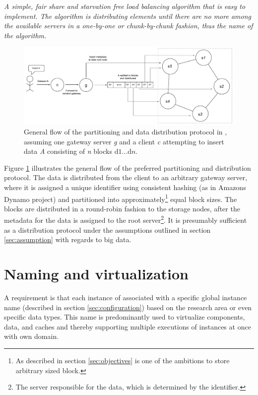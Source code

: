 \begin{definition} \label{def:rr}
\textit{A simple, fair share and starvation free load balancing algorithm that is easy to implement. The algorithm is distributing elements until there are no more among the available servers in a one-by-one or chunk-by-chunk fashion, thus the name of the algorithm.}
\end{definition}
\vspace*{3mm}

\begin{figure}[h!]
	\centering
	\includegraphics[scale=0.5]{pdf/rr-partitioning.pdf}
	\caption[Overview of the partitioning and data distribution protocol]{General flow of the partitioning and data distribution protocol in \CodeName, assuming one gateway server \textit{g} and a client \textit{c} attempting to insert data \textit{A} consisting of \textit{n} blocks $\text{d}1 \ldots \text{d}n$.\label{fig:rr-partitioning}}
\end{figure}

\vspace*{3mm}
Figure \ref{fig:rr-partitioning} illustrates the general flow of the preferred partitioning and distribution protocol. The data is distributed from the client to an arbitrary gateway server, where it is assigned a unique identifier using consistent hashing (as in Amazons Dynamo project) and partitioned into approximately\footnote{As described in section \ref{sec:objectives} is one of the ambitions to store arbitrary sized block.} equal block sizes. The blocks are distributed in a round-robin fashion to the storage nodes, after the metadata for the data is assigned to the root server\footnote{The server responsible for the data, which is determined by the identifier.}. It is presumably sufficient as a distribution protocol under the assumptions outlined in section \ref{sec:assumption} with regards to big data.

\section{Naming and virtualization} \label{sec:virtualization}
A requirement is that each instance of \CodeNameFull associated with a specific global instance name (described in section \ref{sec:configuration}) \eg based on the research area or even specific data types. This name is predominantly used to virtualize components, data, and caches and thereby supporting multiple executions of \CodeName instances at once with own domain.
\newline

